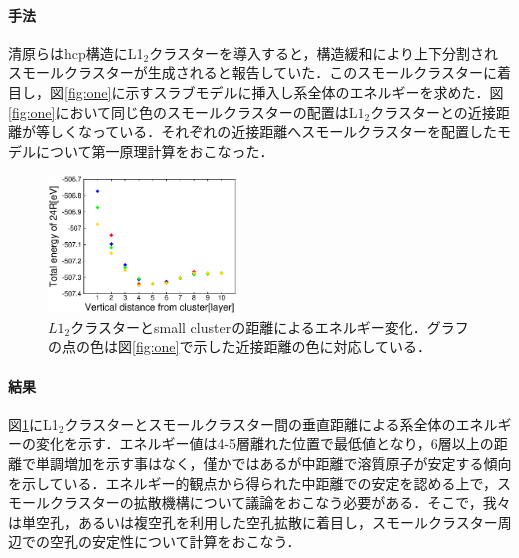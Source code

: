 \documentclass[12pt,a4paper,dvipdfmx]{jsarticle}
\begin{document}
\paragraph{手法}
清原らはhcp構造にL1$_2$クラスターを導入すると，構造緩和により上下分割されスモールクラスターが生成されると報告していた\cite{kiyohara}．このスモールクラスターに着目し，図\ref{fig:one}に示すスラブモデルに挿入し系全体のエネルギーを求めた．図\ref{fig:one}において同じ色のスモールクラスターの配置はL$1_2$クラスターとの近接距離が等しくなっている．それぞれの近接距離へスモールクラスターを配置したモデルについて第一原理計算をおこなった．

\begin{figure}
\vspace{2\baselineskip}
\begin{center}
   \includegraphics[width=50mm]{smallcluster_Alld_JPS2017.eps}
  \caption{$L1_2$クラスターとsmall clusterの距離によるエネルギー変化．グラフの点の色は図\ref{fig:one}で示した近接距離の色に対応している．}
  \label{fig:two}
\end{center}
\vspace{-1\baselineskip}
\end{figure}
\vspace{-1\baselineskip}


\paragraph{結果}
図\ref{fig:two}にL1$_2$クラスターとスモールクラスター間の垂直距離による系全体のエネルギーの変化を示す．エネルギー値は4-5層離れた位置で最低値となり，6層以上の距離で単調増加を示す事はなく，僅かではあるが中距離で溶質原子が安定する傾向を示している．エネルギー的観点から得られた中距離での安定を認める上で，スモールクラスターの拡散機構について議論をおこなう必要がある．そこで，我々は単空孔，あるいは複空孔を利用した空孔拡散に着目し，スモールクラスター周辺での空孔の安定性について計算をおこなう．
\vspace{-0.5\baselineskip}
\end{document}
